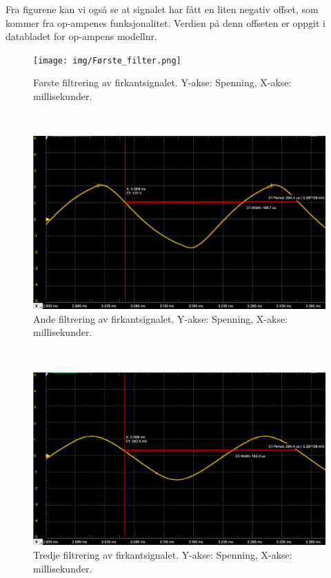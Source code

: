 \documentclass[a4paper,11pt,norsk]{article}
\begin{document}
Fra figurene kan vi også se at signalet har fått en liten negativ offset, som kommer fra op-ampenes funksjonalitet. Verdien på denn offseten er oppgit i databladet for op-ampens modellnr.
\newpage
\begin{figure}[htbp]
    \centering
    \texttt{[image: img/Første\_filter.png]}
    \caption{Første filtrering av firkantsignalet. Y-akse: Spenning, X-akse: millisekunder.}
    \label{fig:first_filter}
\end{figure}\\
\newpage
\begin{figure}[htbp]
    \centering
    \includegraphics[width=1.0\textwidth]{img/Ande_filter.png}
    \caption{Ande filtrering av firkantsignalet. Y-akse: Spenning, X-akse: millisekunder.}
    \label{fig:second_filter}
\end{figure}\\
\newpage
\begin{figure}[htbp]
    \centering
    \includegraphics[width=1.0\textwidth]{img/tredje_filter.png}
    \caption{Tredje filtrering av firkantsignalet. Y-akse: Spenning, X-akse: millisekunder.}
    \label{fig:third_filter}
\end{figure}\\
\end{document}

